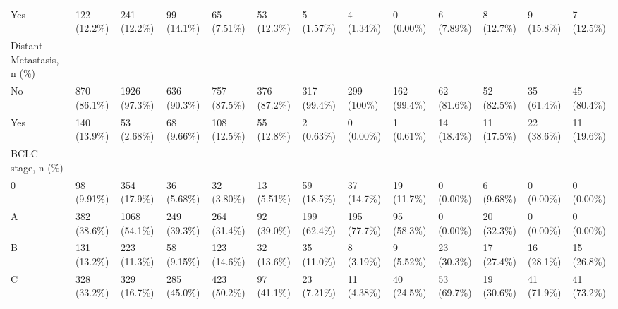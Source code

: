 \begin{landscape}
\begin{center}
\begin{longtable}{p{6.0cm}p{3.0cm}p{3.0cm}p{3.0cm}p{3.0cm}p{3.0cm}p{3.0cm}p{3.0cm}p{3.0cm}p{3.0cm}p{3.0cm}p{3.0cm}p{3.0cm}}
    Yes &   122 (12.2\%)    &   241 (12.2\%)    &    99 (14.1\%)    &    65 (7.51\%)    &    53 (12.3\%)    &    5 (1.57\%)     &    4 (1.34\%)     &    0 (0.00\%)     &    6 (7.89\%)     &    8 (12.7\%)     &    9 (15.8\%)     &    7 (12.5\%)     \\
Distant Metastasis, n (\%) &                  &                  &                  &                  &                  &                  &                  &                  &                  &                  &                  &                  \\
    No &   870 (86.1\%)    &   1926 (97.3\%)   &   636 (90.3\%)    &   757 (87.5\%)    &   376 (87.2\%)    &   317 (99.4\%)    &    299 (100\%)    &   162 (99.4\%)    &    62 (81.6\%)    &    52 (82.5\%)    &    35 (61.4\%)    &    45 (80.4\%)    \\
    Yes &   140 (13.9\%)    &    53 (2.68\%)    &    68 (9.66\%)    &   108 (12.5\%)    &    55 (12.8\%)    &    2 (0.63\%)     &    0 (0.00\%)     &    1 (0.61\%)     &    14 (18.4\%)    &    11 (17.5\%)    &    22 (38.6\%)    &    11 (19.6\%)    \\
BCLC stage, n (\%) &                  &                  &                  &                  &                  &                  &                  &                  &                  &                  &                  &                  \\
    0 &    98 (9.91\%)    &   354 (17.9\%)    &    36 (5.68\%)    &    32 (3.80\%)    &    13 (5.51\%)    &    59 (18.5\%)    &    37 (14.7\%)    &    19 (11.7\%)    &    0 (0.00\%)     &    6 (9.68\%)     &    0 (0.00\%)     &    0 (0.00\%)     \\
    A &   382 (38.6\%)    &   1068 (54.1\%)   &   249 (39.3\%)    &   264 (31.4\%)    &    92 (39.0\%)    &   199 (62.4\%)    &   195 (77.7\%)    &    95 (58.3\%)    &    0 (0.00\%)     &    20 (32.3\%)    &    0 (0.00\%)     &    0 (0.00\%)     \\
    B &   131 (13.2\%)    &   223 (11.3\%)    &    58 (9.15\%)    &   123 (14.6\%)    &    32 (13.6\%)    &    35 (11.0\%)    &    8 (3.19\%)     &    9 (5.52\%)     &    23 (30.3\%)    &    17 (27.4\%)    &    16 (28.1\%)    &    15 (26.8\%)    \\
    C &   328 (33.2\%)    &   329 (16.7\%)    &   285 (45.0\%)    &   423 (50.2\%)    &    97 (41.1\%)    &    23 (7.21\%)    &    11 (4.38\%)    &    40 (24.5\%)    &    53 (69.7\%)    &    19 (30.6\%)    &    41 (71.9\%)    &    41 (73.2\%)    \\

\end{longtable}
\end{center}
\end{landscape}
